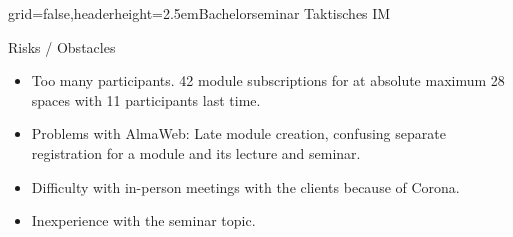 \documentclass[english]{kiesgrube}
\begin{document}
\begin{poster}{grid=false,headerheight=2.5em}{}{Bachelorseminar Taktisches IM}{}{}
\begin{posterbox}[name=risks,column=1,below=event]{Risks / Obstacles}
\begin{itemize}
\item Too many participants. 42 module subscriptions for at absolute maximum 28 spaces with 11 participants last time.
\item Problems with AlmaWeb: Late module creation, confusing separate registration for a module and its lecture and seminar.
\item Difficulty with in-person meetings with the clients because of Corona.
\item Inexperience with the seminar topic.
\end{itemize}
\end{posterbox}
\end{poster}
\end{document}
